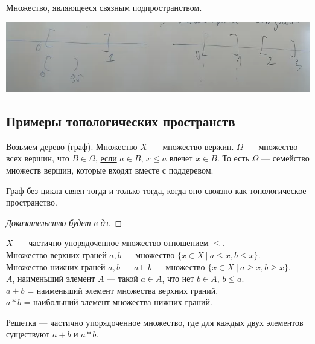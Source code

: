 \begin{definition}

    Множество, являющееся связным подпространством.
\end{definition}

\begin{center}
    \includegraphics[scale=0.6]{img/topology_connectivy}
\end{center}

\subsection{Примеры топологических пространств}
Возьмем дерево (граф). Множество $X$~--- множество вержин. $\Omega$~--- множество всех вершин, что
$B \in \Omega$, \underline{если} $a \in B$, $x \leqslant a$ влечет $x \in B$. 
То есть $\Omega$ --- семейство множеств вершин, которые входят вместе с поддеревом.  

\begin{theorem}
    Граф без цикла свяен тогда и только тогда, когда оно своязно как топологическое пространство.
    \begin{proof}[Доказательство будет в дз]
    \end{proof}
\end{theorem}

\begin{definition}[Решетки]
    $X$~--- частично упорядоченное множество отношением $\leqslant$.\\
    Множество верхних граней $a, b$ --- множество $\{ x \in X ~|~ a \leqslant x, b \leqslant x\}$.\\
    Множество нижних граней $a, b$ --- $a \sqcup b$ --- множество $\{ x \in X ~|~ a \geqslant x, b \geqslant x\}$.\\
    $A$, наименьший элемент $A$ --- такой $a \in A$, что нет $b \in A$, $b \leqslant a$.\\
    $a+b$ = наименьший элемент множества верхних граний.\\
    $a*b$ = наибольший элемент множества нижних граний.

    Решетка --- частично упорядоченное множество, где для каждых двух элементов существуют $a+b$ и $a*b$.
\end{definition}

